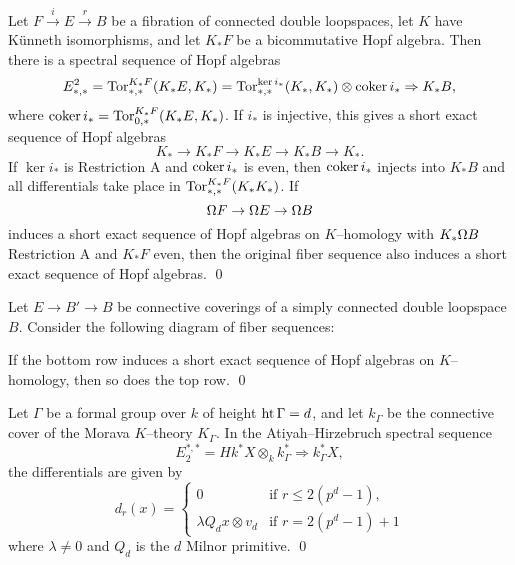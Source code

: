 \begin{theorem}
Let $F \xrightarrow i E \xrightarrow r B$ be a fibration of connected double loopspaces, let $K$ have K\"unneth isomorphisms, and let $K_* F$ be a bicommutative Hopf algebra.  Then there is a spectral sequence of Hopf algebras \[E^2_{*, *} = \operatorname{Tor}^{K_* F}_{*, *}(K_* E, K_*) = \operatorname{Tor}^{\ker i_*}_{*, *}(K_*, K_*) \otimes \operatorname{coker} i_* \Rightarrow K_* B,\] where $\operatorname{coker} i_* = \operatorname{Tor}^{K_* F}_{0, *}(K_* E, K_*)$.  If $i_*$ is injective, this gives a short exact sequence of Hopf algebras \[K_* \to K_* F \to K_* E \to K_* B \to K_*.\]  If $\ker i_*$ is Restriction A and $\operatorname{coker} i_*$ is even, then $\operatorname{coker} i_*$ injects into $K_* B$ and all differentials take place in $\operatorname{Tor}^{K_* F}_{*, *}(K_* K_*)$.  If \[\Omega F \to \Omega E \to \Omega B\] induces a short exact sequence of Hopf algebras on $K$--homology with $K_* \Omega B$ Restriction A and $K_* F$ even, then the original fiber sequence also induces a short exact sequence of Hopf algebras. \qed
\end{theorem}

\begin{corollary}
Let $E \to B' \to B$ be connective coverings of a simply connected double loopspace $B$.  Consider the following diagram of fiber sequences:
\begin{center}
\end{center}
If the bottom row induces a short exact sequence of Hopf algebras on $K$--homology, then so does the top row. \qed {}
\end{corollary}







\begin{lemma}
Let $\Gamma$ be a formal group over $k$ of height $\operatorname{ht}{\Gamma} = d$, and let $k_\Gamma$ be the connective cover of the Morava $K$--theory $K_\Gamma$.  In the Atiyah--Hirzebruch spectral sequence \[E_2^{*, *} = Hk^* X \otimes_k k_\Gamma^* \Rightarrow k_\Gamma^* X,\] the differentials are given by \[d_r(x) = \begin{cases} 0 & \text{if $r \le 2(p^d - 1)$}, \\ \lambda Q_d x \otimes v_d & \text{if $r = 2(p^d - 1) + 1$} \end{cases}\] where $\lambda \ne 0$ and $Q_d$ is the $d${\th} Milnor primitive. \qed
\end{lemma}





